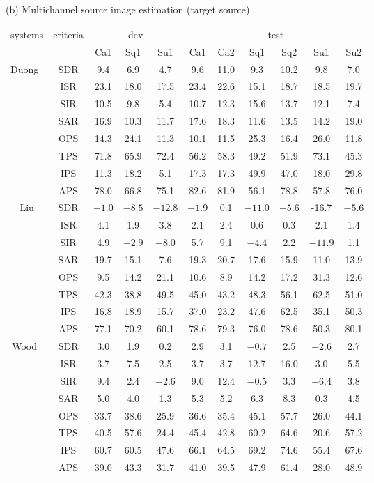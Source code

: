 \documentclass{article}
\begin{document}
\begin{table*}
\ \\
(b) Multichannel source image estimation (target source)
\begin{tabular}{|c|c|ccc|cccccc|}
\hline
\multirow{2}{*}{systems}& \multirow{2}{*}{criteria} & \multicolumn{3}{c|}{dev} & \multicolumn{6}{c|}{test}\\
&&Ca1&Sq1&Su1&Ca1&Ca2&Sq1&Sq2&Su1&Su2\\\hline
\multirow{8}{*}{Duong~\cite{Duong2015}}
&SDR&9.4&6.9&4.7&9.6&11.0&9.3&10.2&9.8&7.0\\
&ISR&23.1&18.0&17.5&23.4&22.6&15.1&18.7&18.5&19.7\\
&SIR&10.5&9.8&5.4&10.7&12.3&15.6&13.7&12.1&7.4\\
&SAR&16.9&10.3&11.7&17.6&18.3&11.6&13.5&14.2&19.0\\
&OPS&14.3&24.1&11.3&10.1&11.5&25.3&16.4&26.0&11.8\\
&TPS&71.8&65.9&72.4&56.2&58.3&49.2&51.9&73.1&45.3\\
&IPS&11.3&18.2&5.1&17.3&17.3&49.9&47.0&18.0&29.8\\
&APS&78.0&66.8&75.1&82.6&81.9&56.1&78.8&57.8&76.0\\
\hline
\multirow{8}{*}{Liu}
&SDR&$-1.0$&$-8.5$&$-12.8$&$-1.9$&0.1&$-11.0$&$-5.6$&-16.7&$-5.6$\\
&ISR&4.1&1.9&3.8&2.1&2.4&0.6&0.3&2.1&1.4\\
&SIR&4.9&$-2.9$&$-8.0$&5.7&9.1&$-4.4$&2.2&$-11.9$&1.1\\
&SAR&19.7&15.1&7.6&19.3&20.7&17.6&15.9&11.0&13.9\\
&OPS&9.5&14.2&21.1&10.6&8.9&14.2&17.2&31.3&12.6\\
&TPS&42.3&38.8&49.5&45.0&43.2&48.3&56.1&62.5&51.0\\
&IPS&16.8&18.9&15.7&37.0&23.2&47.6&62.5&35.1&50.3\\
&APS&77.1&70.2&60.1&78.6&79.3&76.0&78.6&50.3&80.1\\
\hline
\multirow{8}{*}{Wood~\cite{Wood2016}}
&SDR&3.0&1.9&0.2&2.9&3.1&$-0.7$&2.5&$-2.6$&2.7\\
&ISR&3.7&7.5&2.5&3.7&3.7&12.7&16.0&3.0&5.5\\
&SIR&9.4&2.4&$-2.6$&9.0&12.4&$-0.5$&3.3&$-6.4$&3.8\\
&SAR&5.0&4.0&1.3&5.3&5.2&6.3&8.3&0.3&4.5\\
&OPS&33.7&38.6&25.9&36.6&35.4&45.1&57.7&26.0&44.1\\
&TPS&40.5&57.6&24.4&45.4&42.8&60.2&64.6&20.6&57.2\\
&IPS&60.7&60.5&47.6&66.1&64.5&69.2&74.6&55.4&67.6\\
&APS&39.0&43.3&31.7&41.0&39.5&47.9&61.4&28.0&48.9\\
\hline
\end{tabular}
\end{table*}
\end{document}
